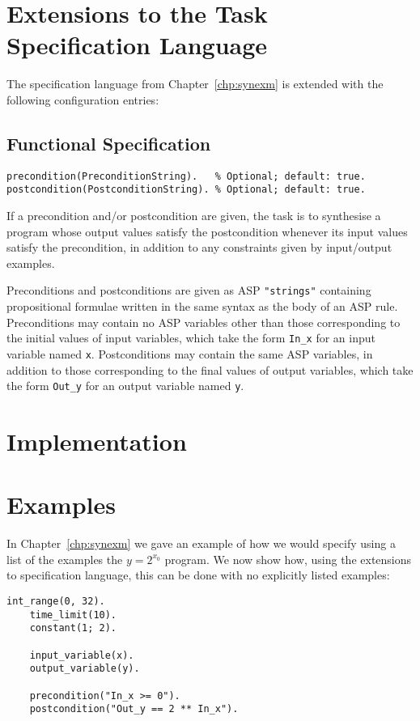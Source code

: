 \documentclass[a4paper,twoside,notitlepage]{report}
\newcommand{\ttt}{\texttt}
\begin{document}
\section{Extensions to the Task Specification Language}
The specification language from Chapter~\ref{chp:synexm} is extended with 
the following configuration entries:

\subsection{Functional Specification}

\begin{Verbatim}[samepage=true]
precondition(PreconditionString).   % Optional; default: true.
postcondition(PostconditionString). % Optional; default: true.
\end{Verbatim}
If a precondition and/or postcondition are given, the task is to synthesise a 
program whose output values satisfy the postcondition whenever its input 
values satisfy the precondition, in addition to any constraints given by 
input/output examples.

Preconditions and postconditions are given as ASP \verb|"strings"|
containing propositional formulae written in the same syntax as the body of an 
ASP rule. Preconditions may contain no ASP variables other than those 
corresponding to the initial values of input variables, which take the form 
\ttt{In\_x} for an input variable named \ttt{x}. Postconditions may contain 
the same ASP variables, in addition to those corresponding to the final values 
of output variables, which take the form \ttt{Out\_y} for an output variable 
named \ttt{y}.

\section{Implementation}

\section{Examples}

In Chapter~\ref{chp:synexm} we gave an example of how we would specify 
using a list of the examples the $y = 2^{x_0}$ program. We now show how, 
using the extensions to specification language, this can be done with no 
explicitly listed examples:

\begin{Verbatim}[samepage=true]
    int_range(0, 32).
    time_limit(10).
    constant(1; 2).    

    input_variable(x).
    output_variable(y).

    precondition("In_x >= 0").
    postcondition("Out_y == 2 ** In_x").
\end{Verbatim}
\end{document}
